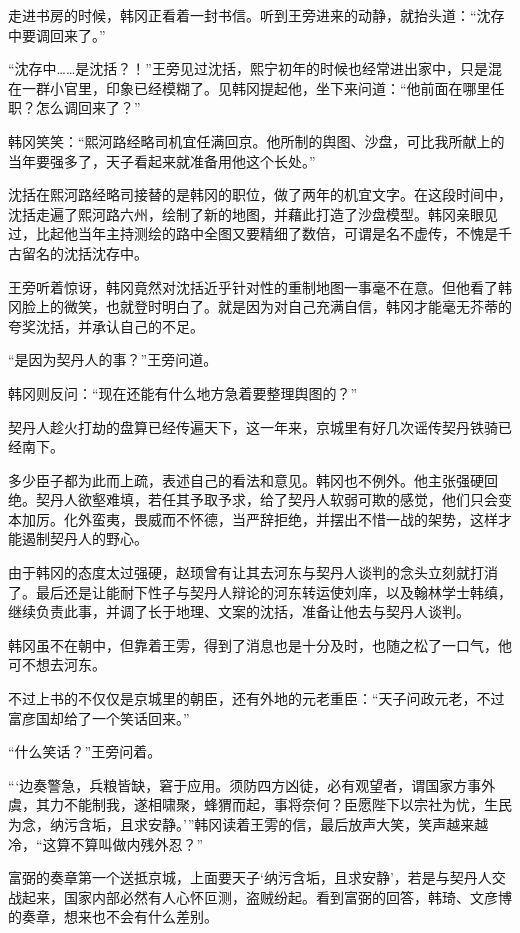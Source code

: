 走进书房的时候，韩冈正看着一封书信。听到王旁进来的动静，就抬头道：“沈存中要调回来了。”

“沈存中……是沈括？！”王旁见过沈括，熙宁初年的时候也经常进出家中，只是混在一群小官里，印象已经模糊了。见韩冈提起他，坐下来问道：“他前面在哪里任职？怎么调回来了？”

韩冈笑笑：“熙河路经略司机宜任满回京。他所制的舆图、沙盘，可比我所献上的当年要强多了，天子看起来就准备用他这个长处。”

沈括在熙河路经略司接替的是韩冈的职位，做了两年的机宜文字。在这段时间中，沈括走遍了熙河路六州，绘制了新的地图，并藉此打造了沙盘模型。韩冈亲眼见过，比起他当年主持测绘的路中全图又要精细了数倍，可谓是名不虚传，不愧是千古留名的沈括沈存中。

王旁听着惊讶，韩冈竟然对沈括近乎针对性的重制地图一事毫不在意。但他看了韩冈脸上的微笑，也就登时明白了。就是因为对自己充满自信，韩冈才能毫无芥蒂的夸奖沈括，并承认自己的不足。

“是因为契丹人的事？”王旁问道。

韩冈则反问：“现在还能有什么地方急着要整理舆图的？”

契丹人趁火打劫的盘算已经传遍天下，这一年来，京城里有好几次谣传契丹铁骑已经南下。

多少臣子都为此而上疏，表述自己的看法和意见。韩冈也不例外。他主张强硬回绝。契丹人欲壑难填，若任其予取予求，给了契丹人软弱可欺的感觉，他们只会变本加厉。化外蛮夷，畏威而不怀德，当严辞拒绝，并摆出不惜一战的架势，这样才能遏制契丹人的野心。

由于韩冈的态度太过强硬，赵顼曾有让其去河东与契丹人谈判的念头立刻就打消了。最后还是让能耐下性子与契丹人辩论的河东转运使刘庠，以及翰林学士韩缜，继续负责此事，并调了长于地理、文案的沈括，准备让他去与契丹人谈判。

韩冈虽不在朝中，但靠着王雱，得到了消息也是十分及时，也随之松了一口气，他可不想去河东。

不过上书的不仅仅是京城里的朝臣，还有外地的元老重臣：“天子问政元老，不过富彦国却给了一个笑话回来。”

“什么笑话？”王旁问着。

“‘边奏警急，兵粮皆缺，窘于应用。须防四方凶徒，必有观望者，谓国家方事外虞，其力不能制我，遂相啸聚，蜂猬而起，事将奈何？臣愿陛下以宗社为忧，生民为念，纳污含垢，且求安静。’”韩冈读着王雱的信，最后放声大笑，笑声越来越冷，“这算不算叫做内残外忍？”

富弼的奏章第一个送抵京城，上面要天子‘纳污含垢，且求安静’，若是与契丹人交战起来，国家内部必然有人心怀叵测，盗贼纷起。看到富弼的回答，韩琦、文彦博的奏章，想来也不会有什么差别。

